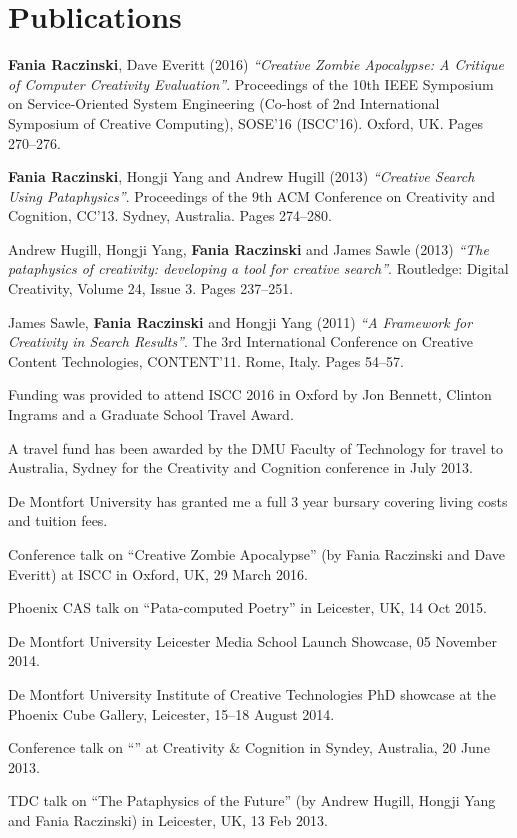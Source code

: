 
\pagestyle{empty}

\chapter{Publications}
\label{pubs}

\textbf{Fania Raczinski}, Dave Everitt (2016) \emph{``Creative Zombie Apocalypse: A Critique of Computer Creativity Evaluation''}. Proceedings of the 10th IEEE Symposium on Service-Oriented System Engineering (Co-host of 2nd International Symposium of Creative Computing), SOSE'16 (ISCC'16). Oxford, UK. Pages 270--276.

\textbf{Fania Raczinski}, Hongji Yang and Andrew Hugill (2013) \emph{``Creative Search Using Pataphysics''}. Proceedings of the 9th ACM Conference on Creativity and Cognition, CC'13. Sydney, Australia. Pages 274--280.

Andrew Hugill, Hongji Yang, \textbf{Fania Raczinski} and James Sawle (2013) \emph{``The pataphysics of creativity: developing a tool for creative search''}. Routledge: Digital Creativity, Volume 24, Issue 3. Pages 237--251.

James Sawle, \textbf{Fania Raczinski} and Hongji Yang (2011) \emph{``A Framework for Creativity in Search Results''}. The 3rd International Conference on Creative Content Technologies, CONTENT'11. Rome, Italy. Pages 54--57.

\grule{}

Funding was provided to attend ISCC 2016 in Oxford by Jon Bennett, Clinton Ingrams and a Graduate School Travel Award.

A travel fund has been awarded by the DMU Faculty of Technology for travel to Australia, Sydney for the Creativity and Cognition conference in July 2013.

De Montfort University has granted me a full 3 year bursary covering living costs and tuition fees.

\grule{}

Conference talk on ``Creative Zombie Apocalypse'' (by Fania Raczinski and Dave Everitt) at ISCC in Oxford, UK, 29 March 2016.

Phoenix CAS talk on ``Pata-computed Poetry'' in Leicester, UK, 14 Oct 2015.

De Montfort University Leicester Media School Launch Showcase, 05 November 2014.

De Montfort University Institute of Creative Technologies PhD showcase at the Phoenix Cube Gallery, Leicester, 15--18 August 2014.

Conference talk on ``'' at Creativity & Cognition in Syndey, Australia, 20 June 2013.

TDC talk on ``The Pataphysics of the Future'' (by Andrew Hugill, Hongji Yang and Fania Raczinski) in Leicester, UK, 13 Feb 2013.

\clearpage
